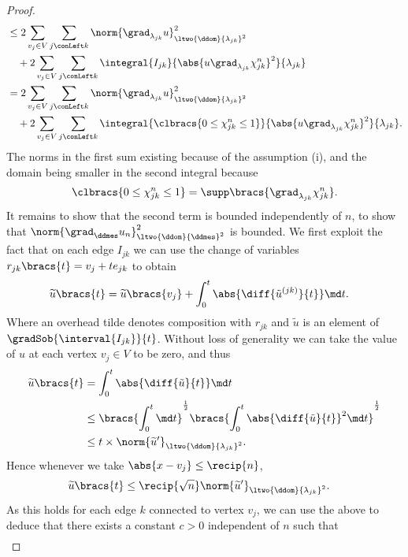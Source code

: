\begin{proof}
\begin{align*}
		&\leq 2\sum_{v_j\in V}\sum_{j\conLeft k}\norm{\grad_{\lambda_{jk}}u}_{\ltwo{\ddom}{\lambda_{jk}}^2}^2 \\
		&\quad + 2\sum_{v_j\in V}\sum_{j\conLeft k}\integral{I_{jk}}{\abs{u\grad_{\lambda_{jk}}\chi_{jk}^n}^2}{\lambda_{jk}} \\
		&= 2\sum_{v_j\in V}\sum_{j\conLeft k}\norm{\grad_{\lambda_{jk}}u}_{\ltwo{\ddom}{\lambda_{jk}}^2}^2 \\
		&\quad + 2\sum_{v_j\in V}\sum_{j\conLeft k}\integral{\clbracs{0\leq\chi_{jk}^n\leq 1}}{\abs{u\grad_{\lambda_{jk}}\chi_{jk}^n}^2}{\lambda_{jk}}.
	\end{align*}
	The norms in the first sum existing because of the assumption (i), and the domain being smaller in the second integral because 
	\begin{align*}
		\clbracs{0\leq\chi_{jk}^n\leq 1} = \supp\bracs{\grad_{\lambda_{jk}}\chi_{jk}^n}.
	\end{align*}
	It remains to show that the second term is bounded independently of $n$, to show that $\norm{\grad_{\ddmes}u_n}_{\ltwo{\ddom}{\ddmes}^2}^2$ is bounded. 
	We first exploit the fact that on each edge $I_{jk}$ we can use the change of variables $r_{jk}\bracs{t} = v_j + t e_{jk}$ to obtain
	\begin{align*}
		\widetilde{u}\bracs{t} &= \widetilde{u}\bracs{v_j} + \int_0^t \abs{\diff{\tilde{u}^{(jk)}}{t}} \md t.
	\end{align*}
	Where an overhead tilde denotes composition with $r_{jk}$ and $\widetilde{u}$ is an element of $\gradSob{\interval{I_{jk}}}{t}$.	
	Without loss of generality we can take the value of $u$ at each vertex $v_j\in V$ to be zero, and thus
	\begin{align*}
		\widetilde{u}\bracs{t} &= \int_0^t \abs{\diff{\tilde{u}}{t}} \md t \\
		&\leq \bracs{ \int_0^t \md t }^{\frac{1}{2}} \bracs{ \int_0^t \abs{\diff{\tilde{u}}{t}}^2 \md t }^{\frac{1}{2}} \\
		&\leq t\times \norm{\widetilde{u}'}_{\ltwo{\ddom}{\lambda_{jk}}^2}.
	\end{align*}
	Hence whenever we take $\abs{x-v_j}\leq\recip{n}$, 
	\begin{align*}
		\widetilde{u}\bracs{t} &\leq \recip{\sqrt{n}}\norm{\widetilde{u}'}_{\ltwo{\ddom}{\lambda_{jk}}^2}.
	\end{align*}		
	As this holds for each edge $k$ connected to vertex $v_j$, we can use the above to deduce that there exists a constant $c>0$ independent of $n$ such that
	\begin{align*}

\end{align*}
\end{proof}
